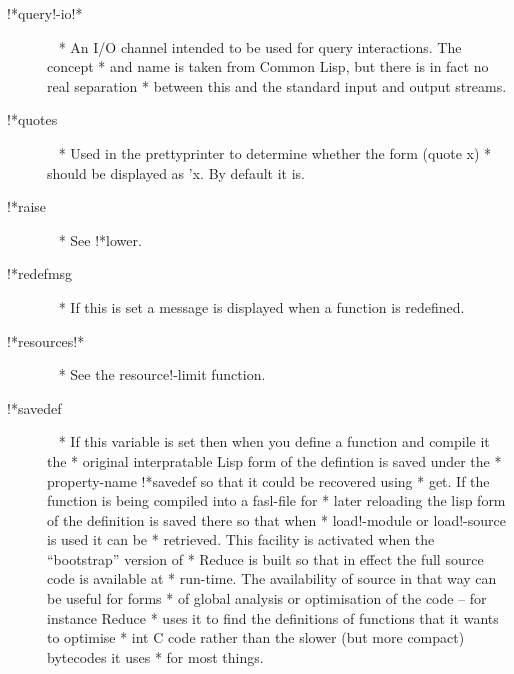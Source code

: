 \documentclass[a4paper,11pt]{article}
\begin{document}
\begin{description}
\item [{\ttfamily !*query!-io!*}]  ~\newline
  * An I/O channel intended to be used for query interactions. The concept
  * and name is taken from Common Lisp, but there is in fact no real separation
  * between this and the standard input and output streams.

\item [{\ttfamily !*quotes}]  ~\newline
  * Used in the prettyprinter to determine whether the form {\ttfamily (quote x)}
  * should be displayed as {\ttfamily 'x}. By default it is.

\item [{\ttfamily !*raise}]  ~\newline
  * See {\ttfamily !*lower}.

\item [{\ttfamily !*redefmsg}]  ~\newline
  * If this is set a message is displayed when a function is redefined.

\item [{\ttfamily !*resources!*}]  ~\newline
  * See the {\ttfamily resource!-limit} function.

\item [{\ttfamily !*savedef}]  ~\newline
  * If this variable is set then when you define a function and compile it the
  * original interpratable Lisp form of the defintion is saved under the
  * property-name {\ttfamily !*savedef} so that it could be recovered using
  * {\ttfamily get}. If the function is being compiled into a fasl-file for
  * later reloading the lisp form of the definition is saved there so that when
  * {\ttfamily load!-module} or {\ttfamily load!-source} is used it can be
  * retrieved. This facility is activated when the ``bootstrap'' version of
  * Reduce is built so that in effect the full source code is available at
  * run-time. The availability of source in that way can be useful for forms
  * of global analysis or optimisation of the code -- for instance Reduce
  * uses it to find the definitions of functions that it wants to optimise
  * int C code rather than the slower (but more compact) bytecodes it uses
  * for most things.


\end{description}
\end{document}
